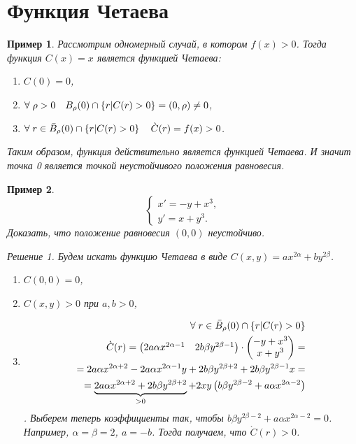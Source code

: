 \documentclass[a5paper, 11pt]{article}
\theoremstyle{definition}
\theoremstyle{plain}
\newtheorem{Ex}{Пример}
\theoremstyle{remark}
\newtheorem*{Solution}{Решение}
\begin{document}
	\section[14.04.2023]{Функция Четаева}
	\begin{Ex}
		Рассмотрим одномерный случай, в котором $f(x)>0$.
		Тогда функция $C(x) = x$ является функцией Четаева:
		\begin{enumerate}
			\item $C(0) = 0$,
			\item $\forall \;\rho > 0 \quad B_\rho(0) \cap \left\{r|C(r)>0\right\} = \left(0,\rho\right) \not = 0$,
			\item $\forall \; r\in \bar{B}_\rho(0) \cap \left\{r|C(r)>0\right\} \quad \grave{C}(r) = f(x) > 0$.
		\end{enumerate}
		Таким образом, функция действительно является функцией Четаева. И значит точка 0 является точкой неустойчивого положения равновесия.
	\end{Ex}
	\begin{Ex}
		\[
		\begin{cases}
			x'=-y+x^3,\\
			y'=x+y^3.
		\end{cases}
		\]
		Доказать, что положение равновесия $(0,0)$ неустойчиво. 
		\begin{Solution}
			Будем искать функцию Четаева в виде $C(x,y) = ax^{2\alpha} + by^{2\beta}$.
				\begin{enumerate}
				\item $C(0,0) = 0$,
				\item $C(x,y)>0$ при $a,b>0$,
				\item \[\begin{split}\forall \; r\in \bar{B}_\rho(0) \cap \left\{r|C(r)>0\right\}\\ \grave{C}(r) = \begin{pmatrix}
					2a\alpha x^{2\alpha-1} & 2b\beta y^{2\beta-1}
				\end{pmatrix} \cdot \begin{pmatrix}
				-y+x^3\\x+y^3
			\end{pmatrix} = \\
		= 2a\alpha x^{2\alpha+2} - 2a\alpha x^{2\alpha-1}y +  2b\beta y^{2\beta+2} + 2b\beta y^{2\beta-1}x = \\
		= \underbrace{2a\alpha x^{2\alpha+2} +  2b\beta y^{2\beta+2}}_{>0} + 2xy \left(b\beta y^{2\beta-2} + a\alpha x^{2\alpha-2}\right)
		\end{split}\].
			Выберем теперь коэффициенты так, чтобы $b\beta y^{2\beta-2} + a\alpha x^{2\alpha-2} = 0$. Например, $\alpha = \beta = 2$, $a=-b$. Тогда получаем, что $\grave{C}(r) > 0$.
			\end{enumerate}
		\end{Solution}
	\end{Ex}
\end{document}
